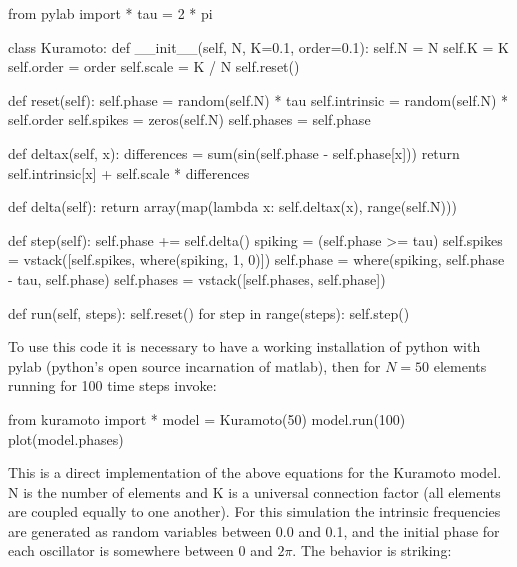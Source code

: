 \documentclass[12pt]{article}
\begin{document}
\begin{python}[]
from pylab import *
tau = 2 * pi

class Kuramoto:
    def __init__(self, N, K=0.1, order=0.1):
        self.N = N
        self.K = K
        self.order = order
        self.scale = K / N
        self.reset()

    def reset(self):
        self.phase = random(self.N) * tau
        self.intrinsic = random(self.N) * self.order
        self.spikes = zeros(self.N)
        self.phases = self.phase

    def deltax(self, x):
        differences = sum(sin(self.phase - self.phase[x]))
        return self.intrinsic[x] + self.scale * differences

    def delta(self):
        return array(map(lambda x: self.deltax(x), range(self.N)))

    def step(self):
        self.phase += self.delta()
        spiking = (self.phase >= tau)
        self.spikes = vstack([self.spikes, where(spiking, 1, 0)])
        self.phase = where(spiking, self.phase - tau, self.phase)
        self.phases = vstack([self.phases, self.phase])

    def run(self, steps):
        self.reset()
        for step in range(steps):
            self.step()
\end{python}

To use this code it is necessary to have a working installation of python with pylab (python's open source incarnation of matlab), then for $N=50$ elements running for 100 time steps invoke:

\begin{python}
from kuramoto import *
model = Kuramoto(50)
model.run(100)
plot(model.phases)
\end{python}

This is a direct implementation of the above equations for the Kuramoto model.  N is the number of elements and K is a universal connection factor (all elements are coupled equally to one another). For this simulation the intrinsic frequencies are generated as random variables between 0.0 and 0.1, and the initial phase for each oscillator is somewhere between $0$ and $2\pi$.  The behavior is striking:
\end{document}
